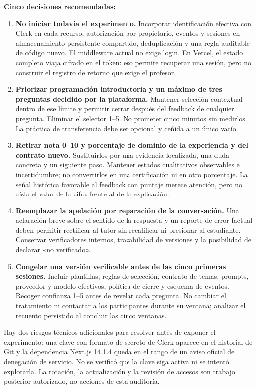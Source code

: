 \documentclass[11pt,a4paper]{report}
\begin{document}
\textbf{Cinco decisiones recomendadas:}
\begin{enumerate}
\item \textbf{No iniciar todavía el experimento.} Incorporar identificación efectiva con Clerk en cada recurso, autorización por propietario, eventos y sesiones en almacenamiento persistente compartido, deduplicación y una regla auditable de código nuevo. El middleware actual no exige login. En Vercel, el estado completo viaja cifrado en el token: eso permite recuperar una sesión, pero no construir el registro de retorno que exige el profesor.
\item \textbf{Priorizar programación introductoria y un máximo de tres preguntas decidido por la plataforma.} Mantener selección contextual dentro de ese límite y permitir cerrar después del feedback de cualquier pregunta. Eliminar el selector 1--5. No prometer cinco minutos sin medirlos. La práctica de transferencia debe ser opcional y ceñida a un único vacío.
\item \textbf{Retirar nota 0--10 y porcentaje de dominio de la experiencia y del contrato nuevo.} Sustituirlos por una evidencia localizada, una duda concreta y un siguiente paso. Mantener estados cualitativos observables e incertidumbre; no convertirlos en una certificación ni en otro porcentaje. La señal histórica favorable al feedback con puntaje merece atención, pero no aísla el valor de la cifra frente al de la explicación.
\item \textbf{Reemplazar la apelación por reparación de la conversación.} Una aclaración breve sobre el sentido de la respuesta y un reporte de error factual deben permitir rectificar al tutor sin recalificar ni presionar al estudiante. Conservar verificadores internos, trazabilidad de versiones y la posibilidad de declarar «no verificado».
\item \textbf{Congelar una versión verificable antes de las cinco primeras sesiones.} Incluir plantillas, reglas de selección, contrato de temas, prompts, proveedor y modelo efectivos, política de cierre y esquema de eventos. Recoger confianza 1--5 antes de revelar cada pregunta. No cambiar el tratamiento ni contactar a los participantes durante su ventana; analizar el recuento persistido al concluir las cinco ventanas.
\end{enumerate}

Hay dos riesgos técnicos adicionales para resolver antes de exponer el experimento: una clave con formato de secreto de Clerk aparece en el historial de Git y la dependencia Next.js 14.1.4 queda en el rango de un aviso oficial de denegación de servicio. No se verificó que la clave siga activa ni se intentó explotarla. La rotación, la actualización y la revisión de accesos son trabajo posterior autorizado, no acciones de esta auditoría.
\end{document}
